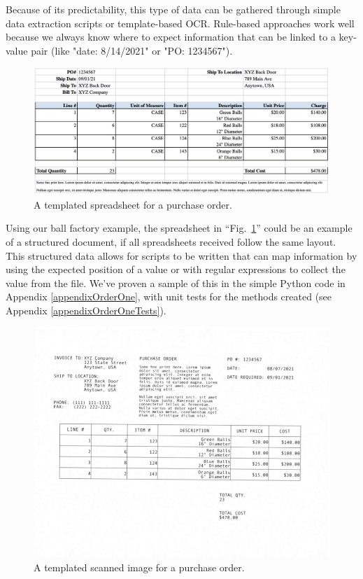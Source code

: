 \documentclass[conference]{IEEEtran}
\begin{document}
Because of its predictability, this type of data can be gathered through simple data extraction scripts or template-based OCR. Rule-based approaches work well because we always know where to expect information that can be linked to a key-value pair (like "date: 8/14/2021" or "PO: 1234567").

\begin{figure}[ht]
\centerline{\includegraphics[width=\columnwidth]{Spreadsheet1.png}}
\caption{A templated spreadsheet for a purchase order.}
\label{figSpreadsheet1}
\end{figure}

Using our ball factory example, the spreadsheet in ``Fig.~\ref{figSpreadsheet1}'' could be an example of a structured document, if all spreadsheets received follow the same layout. This structured data allows for scripts to be written that can map information by using the expected position of a value or with regular expressions to collect the value from the file. We've proven a sample of this in the simple Python code in Appendix \ref{appendixOrderOne}, with unit tests for the methods created (see Appendix \ref{appendixOrderOneTests}).

\begin{figure}[ht]
\centerline{\includegraphics[width=\columnwidth]{ORDER_1_scanned.png}}
\caption{A templated scanned image for a purchase order.}
\label{figScanned1}
\end{figure}
\end{document}
